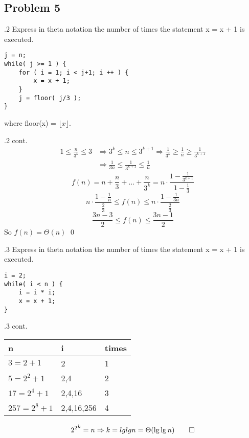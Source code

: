 \documentclass[handout]{beamer}
\begin{document}
    \subsection{Problem 5}
    
        \begin{frame}[fragile]{\subsecname.2}
            Express in theta notation the number of times the statement x = x + 1 is
executed.
            \begin{lstlisting}
j = n;
while( j >= 1 ) {
    for ( i = 1; i < j+1; i ++ ) {
        x = x + 1;
    }
    j = floor( j/3 );
}
            \end{lstlisting}
            where floor(x) = $\lfloor x\rfloor$.
\end{frame} 

    
        \begin{frame}[c]{\subsecname.2 cont.}
            \begin{align*}
            1\leq\frac{n}{3^k}\leq3&\Rightarrow3^k\leq n\leq3^{k+1}  \Rightarrow\frac{1}{3^k}\geq\frac{1}{n}\geq\frac{1}{3^{k+1}}\\
                                   &\Rightarrow \frac{1}{3n}\leq\frac{1}{3^{k+1}}\leq\frac{1}{n}
            \end{align*}
            \[f(n)=n+\frac{n}{3}+\ldots+\frac{n}{3^k}=n\cdot\frac{1-\frac{1}{3^{k+1}}}{1-\frac{1}{3}}\]
            \[n\cdot\frac{1-\frac{1}{n}}{\frac{2}{3}}\leq f(n)\leq n\cdot\frac{1-\frac{1}{3n}}{\frac{2}{3}}\]
            \[\frac{3n-3}{2}\leq f(n)\leq\frac{3n-1}{2}\]
            So $f(n)=\Theta(n)$ \qed
        \end{frame}
    
        \begin{frame}[fragile]{\subsecname.3}
            Express in theta notation the number of times the statement x = x + 1 is
executed.
            \begin{lstlisting}
i = 2;
while( i < n ) {
    i = i * i;
    x = x + 1;
}
            \end{lstlisting}
\end{frame}
    
        \begin{frame}[c]{\subsecname.3 cont.}
            \begin{center}
            \begin{tabular}{lll}
                    \hline%
                    n               & i          & times   \\\hline%
                    $3=2+1      $   & 2          & 1       \\
                    $5=2^2+1    $   & 2,4        & 2       \\
                    $17=2^4+1   $   & 2,4,16     & 3       \\
                    $257=2^8+1  $   & 2,4,16,256 & 4       \\\hline%
            \end{tabular}\pause
            \end{center}
            \[{2^2}^k = n \Rightarrow k=lg{lg{n}}=\Theta(\lg{\lg{n}}) \qed\]
        \end{frame}
\end{document}
